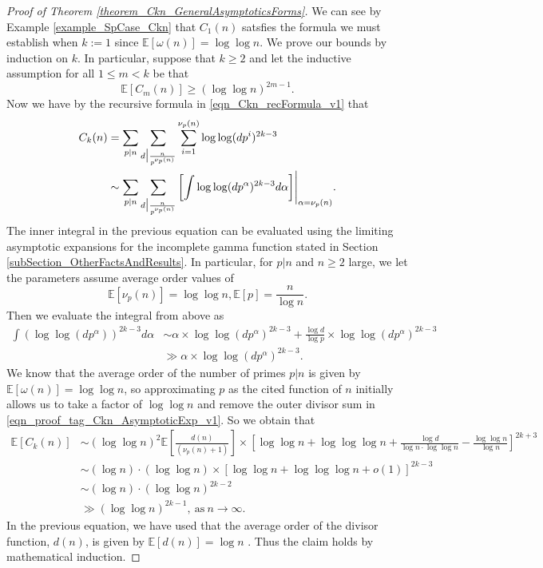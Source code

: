 \documentclass[11pt,reqno,a4letter]{article}
\numberwithin{figure}{section}
\numberwithin{table}{section}
\theoremstyle{plain}
\numberwithin{theorem}{section}
\theoremstyle{definition}
\newcommand{\NBRef}[1]{}
\newcommand{\SuccSim}[0]{\overset{_{\scriptsize{\blacktriangle}}}{\succsim}}
\renewcommand{\SuccSim}[0]{\ensuremath{\gg}}
\begin{document}
\NBRef{A08-2020-04-26} 
\begin{proof}[Proof of Theorem \ref{theorem_Ckn_GeneralAsymptoticsForms}] 
\label{proofOf_theorem_Ckn_GeneralAsymptoticsForms} 
We can see by Example \ref{example_SpCase_Ckn} that $C_1(n)$ 
satsfies the formula we must establish when $k := 1$ since $\mathbb{E}[\omega(n)] = \log\log n$. 
We prove our bounds by induction on $k$. 
In particular, suppose that $k \geq 2$ and let the inductive assumption for all $1 \leq m < k$ 
be that 
\[
\mathbb{E}[C_m(n)] \geq (\log\log n)^{2m-1}. 
\]
Now we have by the recursive formula in \eqref{eqn_Ckn_recFormula_v1} that 
\begin{align} 
\notag 
C_k(n) & = \sum_{p|n} \sum_{d\bigr\rvert\frac{n}{p^{\nu_p(n)}}} \sum_{i=1}^{\nu_p(n)} \log\log(dp^i)^{2k-3} \\ 
\label{eqn_proof_tag_Ckn_AsymptoticExp_v1} 
     & \sim \sum_{p|n} \sum_{d\bigr\rvert\frac{n}{p^{\nu_p(n)}}} \left[ 
     \int \log\log(dp^{\alpha})^{2k-3} d\alpha\right] \Biggr\rvert_{\alpha=\nu_p(n)}. 
\end{align} 
The inner integral in the previous equation can be evaluated using the 
limiting asymptotic expansions for the incomplete gamma function stated in 
Section \ref{subSection_OtherFactsAndResults}. 
In particular, for $p|n$ and $n \geq 2$ large, we let the parameters assume average order values of 
\[
\mathbb{E}[\nu_p(n)] = \log\log n, \mathbb{E}[p] = \frac{n}{\log n}. 
\]
Then we evaluate the integral from above as 
\begin{align*} 
\int (\log\log(dp^{\alpha}))^{2k-3} d\alpha & \sim 
     \alpha \times \log\log(dp^{\alpha})^{2k-3} + 
     \frac{\log d}{\log p} \times \log\log(dp^{\alpha})^{2k-3} \\ 
     & \SuccSim 
     \alpha \times \log\log(dp^{\alpha})^{2k-3}. 
\end{align*} 
We know that the average order of the number of primes $p|n$ is given by 
$\mathbb{E}[\omega(n)] = \log\log n$, so approximating $p$ as the cited function of $n$ initially 
allows us to take a factor of $\log\log n$ and remove the outer divisor sum in 
\eqref{eqn_proof_tag_Ckn_AsymptoticExp_v1}. So we obtain that 
\begin{align*} 
\mathbb{E}[C_k(n)] & \sim (\log\log n)^2 \mathbb{E}\left[\frac{d(n)}{(\nu_p(n) + 1)}\right] \times 
     \left[\log\log n + \log\log\log n + \frac{\log d}{\log n \cdot \log\log n} - 
     \frac{\log\log n}{\log n}\right]^{2k+3} \\ 
     & \sim (\log n) \cdot (\log\log n) \times \left[\log\log n + \log\log\log n + o(1)\right]^{2k-3} \\ 
     & \sim (\log n) \cdot (\log\log n)^{2k-2} \\ 
     & \gg (\log\log n)^{2k-1}, \mathrm{\ as\ } n \rightarrow \infty. 
\end{align*} 
In the previous equation, we have used that the average order of the divisor function, $d(n)$, 
is given by $\mathbb{E}[d(n)] = \log n$ \cite[\S 27.11]{NISTHB}. 
Thus the claim holds by mathematical induction. 
\end{proof} 
\end{document}
